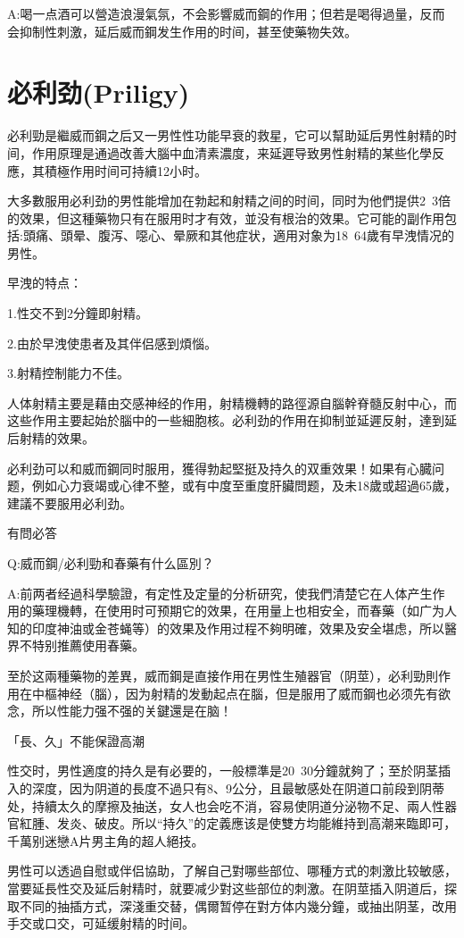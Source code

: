 \documentclass[12pt,UTF8]{ctexbook}
\begin{document}
A:喝一点酒可以營造浪漫氣氛，不会影響威而鋼的作用；但若是喝得過量，反而会抑制性刺激，延后威而鋼发生作用的时间，甚至使藥物失效。

\section{必利劲(Priligy)}

必利勁是繼威而鋼之后又一男性性功能早衰的救星，它可以幫助延后男性射精的时间，作用原理是通過改善大腦中血清素濃度，来延遲导致男性射精的某些化學反應，其積極作用时间可持續12小时。

大多數服用必利劲的男性能增加在勃起和射精之间的时间，同时为他們提供2~3倍的效果，但这種藥物只有在服用时才有效，並没有根治的效果。它可能的副作用包括:頭痛、頭晕、腹泻、噁心、晕厥和其他症状，適用对象为18~64歲有早洩情况的男性。

早洩的特点：

1.性交不到2分鐘即射精。

2.由於早洩使患者及其伴侣感到煩惱。

3.射精控制能力不佳。

人体射精主要是藉由交感神经的作用，射精機轉的路徑源自腦幹脊髓反射中心，而这些作用主要起始於腦中的一些細胞核。必利劲的作用在抑制並延遲反射，達到延后射精的效果。

必利劲可以和威而鋼同时服用，獲得勃起堅挺及持久的双重效果！如果有心臓问题，例如心力衰竭或心律不整，或有中度至重度肝臟問题，及未18歲或超過65歲，建議不要服用必利劲。

有問必答

Q:威而鋼/必利勁和春藥有什么區別？

A:前两者经過科學驗證，有定性及定量的分析研究，使我們清楚它在人体产生作用的藥理機轉，在使用时可预期它的效果，在用量上也相安全，而春藥（如广为人知的印度神油或金苍蝇等）的效果及作用过程不夠明確，效果及安全堪虑，所以醫界不特别推薦使用春藥。

至於这兩種藥物的差異，威而鋼是直接作用在男性生殖器官（阴莖），必利勁則作用在中樞神经（腦），因为射精的发動起点在腦，但是服用了威而鋼也必须先有欲念，所以性能力强不强的关鍵還是在脑！

「長、久」不能保證高潮

性交时，男性適度的持久是有必要的，一般標準是20~30分鐘就夠了；至於阴茎插入的深度，因为阴道的長度不過只有8、9公分，且最敏感处在阴道口前段到阴蒂处，持續太久的摩擦及抽送，女人也会吃不消，容易使阴道分泌物不足、兩人性器官紅腫、发炎、破皮。所以“持久”的定義應该是使雙方均能維持到高潮来臨即可，千萬别迷戀A片男主角的超人絕技。

男性可以透過自慰或伴侣協助，了解自己對哪些部位、哪種方式的刺激比较敏感，當要延長性交及延后射精时，就要减少對这些部位的刺激。在阴莖插入阴道后，探取不同的抽插方式，深淺重交替，偶爾暂停在對方体内幾分鐘，或抽出阴茎，改用手交或口交，可延缓射精的时间。
\end{document}
